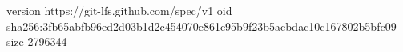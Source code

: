 version https://git-lfs.github.com/spec/v1
oid sha256:3fb65abfb96ed2d03b1d2c454070c861c95b9f23b5acbdac10c167802b5bfc09
size 2796344
